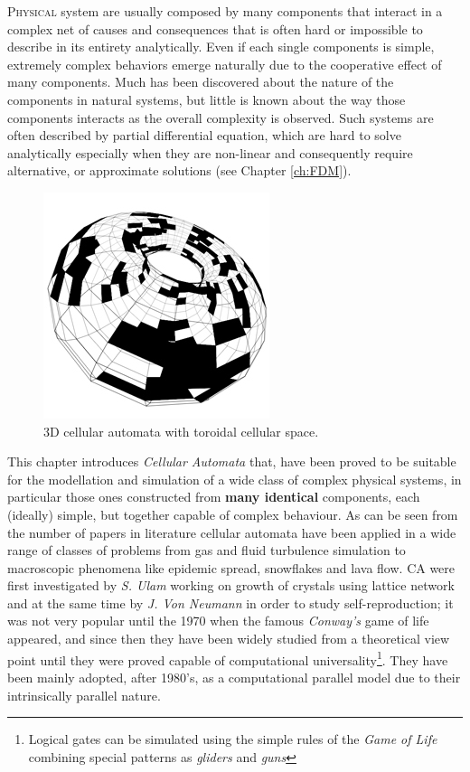 \lettrine[lines=4]{P}{hysical} system are usually composed by many components that interact in a complex net of causes and consequences that is often hard or impossible to describe in its entirety analytically.
Even if each single components is simple, extremely complex behaviors emerge naturally due to the cooperative effect of many components. Much has been discovered about the nature of the components in natural systems, but little is known about the way those components interacts as the overall complexity is observed.
Such systems are often described by partial differential equation, which are hard to solve analytically especially when they are non-linear and consequently require alternative, or approximate solutions (see Chapter \ref{ch:FDM}).
\begin{figure}
\includegraphics[scale=0.8]{./images/CA_FDM/torus-2}
\caption{3D cellular automata with toroidal cellular space.}
\label{torus}
\end{figure}
This chapter introduces \textit{Cellular Automata} that,  have been proved to be suitable for the modellation and simulation of a wide class of complex physical systems, in particular those ones constructed from \textbf{many identical} components, each (ideally) simple, but together capable of complex behaviour\cite{Toffoli1984,toffoli1987}.
As can be seen from the number of papers in literature  cellular automata have been applied in a wide range of classes of problems from gas\cite{Frisch1986} and fluid turbulence\cite{Succi1991} simulation to macroscopic phenomena\cite{Gregorio1999} like epidemic spread\cite{Sirakoulis2000}, snowflakes and lava flow\cite{dspataro_sciara:2017,Crisci2004,Spataro2010}.
CA were first investigated by \textit{S. Ulam} working on growth of crystals using
lattice network and at the same time by \textit{J. Von Neumann} in order to study
self-reproduction\cite{Neumann1966}; it was not very popular until the 1970 when
the famous \textit{Conway's} game of life\cite{conway1970} appeared, and since then  they have been widely studied from  a theoretical view point until they were proved capable of computational universality\footnote{ Logical gates can be simulated using the simple rules of the \textit{Game of Life} combining special patterns as \textit{gliders} and \textit{guns}}\cite{Thatcher1970}. They have been mainly adopted, after 1980's, as a computational parallel model due to their intrinsically parallel nature\cite{Margolus1986}.


